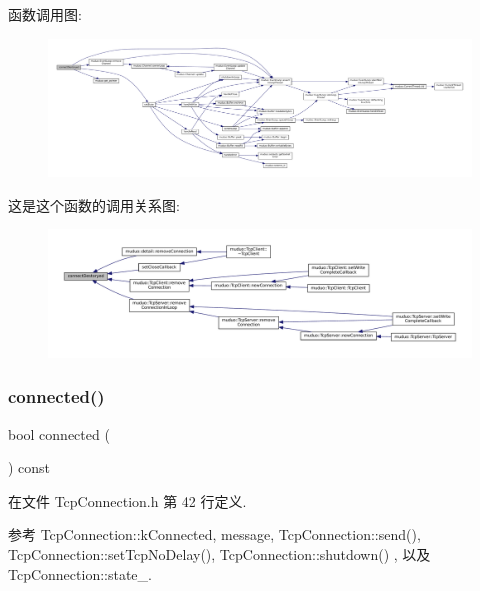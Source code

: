 函数调用图\+:
\nopagebreak
\begin{figure}[H]
\begin{center}
\leavevmode
\includegraphics[width=350pt]{classmuduo_1_1TcpConnection_afff2c1576d605dda12f87d2b32d5c1a2_cgraph}
\end{center}
\end{figure}
这是这个函数的调用关系图\+:
\nopagebreak
\begin{figure}[H]
\begin{center}
\leavevmode
\includegraphics[width=350pt]{classmuduo_1_1TcpConnection_afff2c1576d605dda12f87d2b32d5c1a2_icgraph}
\end{center}
\end{figure}
\mbox{\label{classmuduo_1_1TcpConnection_aa0fd96bc25e3d509fb54028c2e4b91f6}} 
\subsubsection{\texorpdfstring{connected()}{connected()}}
{\footnotesize\ttfamily bool connected (\begin{DoxyParamCaption}{ }\end{DoxyParamCaption}) const\hspace{0.3cm}{\ttfamily [inline]}}



在文件 Tcp\+Connection.\+h 第 42 行定义.



参考 Tcp\+Connection\+::k\+Connected, message, Tcp\+Connection\+::send(), Tcp\+Connection\+::set\+Tcp\+No\+Delay(), Tcp\+Connection\+::shutdown() , 以及 Tcp\+Connection\+::state\+\_\+.

